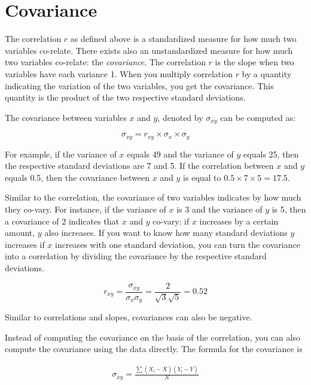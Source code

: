 \documentclass[]{book}\usepackage[]{graphicx}\usepackage[]{color}
\begin{document}
\section{Covariance}

The correlation $r$ as defined above is a standardized measure for how much two variables co-relate. There exists also an unstandardized measure for how much two variables co-relate: the \textit{covariance}. The correlation $r$ is the slope when two variables have each variance 1. When you multiply correlation $r$ by a quantity indicating the variation of the two variables, you get the covariance. This quantity is the product of the two respective standard deviations.

The covariance between variables $x$ and $y$, denoted by $\sigma_{xy}$ can be computed as:


\begin{equation}
\sigma_{xy} = r_{xy} \times \sigma_x \times \sigma_y
\end{equation}

For example, if the variance of $x$ equals 49 and the variance of $y$ equals 25, then the respective standard deviations are 7 and 5. If the correlation between $x$ and $y$ equals 0.5, then the covariance between $x$ and $y$ is equal to $0.5 \times 7 \times 5 = 17.5$.

Similar to the correlation, the covariance of two variables indicates by how much they co-vary. For instance, if the variance of $x$ is 3 and the variance of $y$ is 5, then a covariance of 2 indicates that $x$ and $y$ co-vary: if $x$ increases by a certain amount, $y$ also increases. If you want to know how many standard deviations $y$ increases if $x$ increases with one standard deviation, you can turn the covariance into a correlation by dividing the covariance by the respective standard deviations.

\begin{equation}
r_{xy}= \frac{\sigma_{xy}} { \sigma_x \sigma_y}= \frac{2} { \sqrt{3} \sqrt{5}}=0.52
\end{equation}

Similar to correlations and slopes, covariances can also be negative.


Instead of computing the covariance on the basis of the correlation, you can also compute the covariance using the data directly. The formula for the covariance is 


\begin{eqnarray}
\sigma_{xy} = \frac{\sum(X_i - \bar{X})(Y_i - \bar{Y})}{N}
\end{eqnarray}
\end{document}
